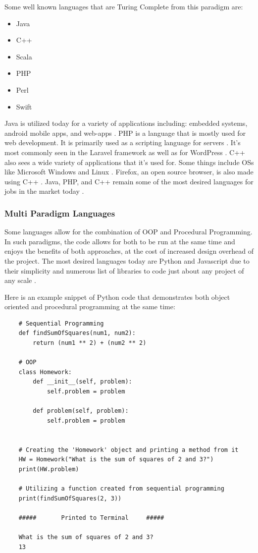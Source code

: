 Some well known languages that are Turing Complete from this paradigm are: 
\begin{itemize}
    \item Java
    \item C++
    \item Scala
    \item PHP
    \item Perl
    \item Swift        
\end{itemize}

Java is utilized today for a variety of applications including: embedded systems, android mobile apps, and web-apps \cite{JavaUse1, JavaUse2}.
PHP is a language that is mostly used for web development.
It is primarily used as a scripting language for servers \cite{PHPScriptingServer}.
It's most commonly seen in the Laravel framework as well as for WordPress \cite{PHPLaravel,PHPWP}.
C++ also sees a wide variety of applications that it's used for.
Some things include OSs like Microsoft Windows and Linux \cite{CPPUse1,CPPUse2}.
Firefox, an open source browser, is also made using C++ \cite{CPPFirefox,FirefoxMain}.
Java, PHP, and C++ remain some of the most desired languages for jobs in the market today \cite{TopLangs1,TopLangs2,TopLangs3}.

\subsubsection{Multi Paradigm Languages}\label{subsubsec:MultiParadigmPL}

Some languages allow for the combination of OOP and Procedural Programming.
In such paradigms, the code allows for both to be run at the same time and enjoys the benefits of both approaches, at the cost of increased design overhead of the project.
The most desired languages today are Python and Javascript due to their simplicity and numerous list of libraries to code just about any project of any scale \cite{TopLangs1,TopLangs2,TopLangs3,EasyLangs1,EasyLangs2,PyLibs,NPM,Yarn}.

Here is an example snippet of Python code that demonstrates both object oriented and procedural programming at the same time:

\begin{verbatim}
    # Sequential Programming
    def findSumOfSquares(num1, num2):
        return (num1 ** 2) + (num2 ** 2)

    # OOP
    class Homework:
        def __init__(self, problem):
            self.problem = problem
            
        def problem(self, problem):
            self.problem = problem


    # Creating the 'Homework' object and printing a method from it
    HW = Homework("What is the sum of squares of 2 and 3?")
    print(HW.problem)

    # Utilizing a function created from sequential programming
    print(findSumOfSquares(2, 3))

    #####       Printed to Terminal     #####

    What is the sum of squares of 2 and 3?
    13
\end{verbatim}

